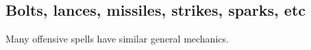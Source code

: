 %
%
%
%
%
%
%
%
%
%
%
%






\subsection*{Bolts, lances, missiles, strikes, sparks, etc}
Many offensive spells have similar general mechanics. 

